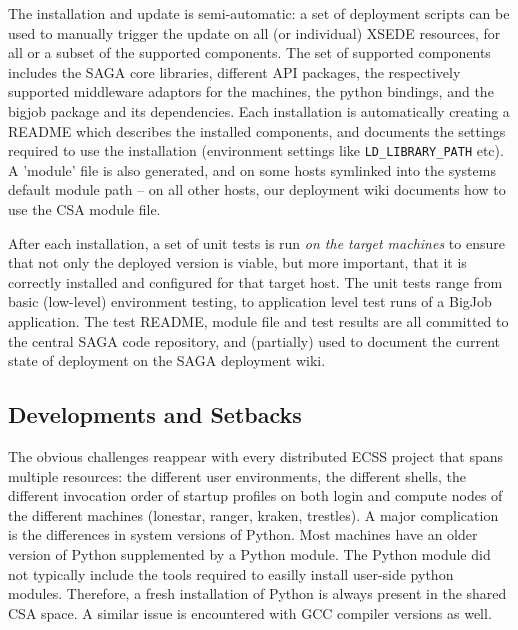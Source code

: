 \documentclass{sig-alternate}
\begin{document}
 The installation and update is semi-automatic: a set of deployment
 scripts can be used to manually trigger the update on all (or
 individual) XSEDE resources, for all or a subset of the supported
 components.  The set of supported components includes the SAGA core
 libraries, different API packages, the respectively supported
 middleware adaptors for the machines, the python bindings, and the
 bigjob package and its dependencies.  Each installation is
 automatically creating a README which describes the installed
 components, and documents the settings required to use the
 installation (environment settings like \texttt{LD\_LIBRARY\_PATH} etc).  A
 'module' file is also generated, and on some hosts symlinked into the
 systems default module path -- on all other hosts, our deployment
 wiki documents how to use the CSA module file.

 After each installation, a set of unit tests is run \textit{on the
 target machines} to ensure that not only the deployed version is
 viable, but more important, that it is correctly installed and
 configured for that target host.  The unit tests range from basic
 (low-level) environment testing, to application level test runs of a
 BigJob application.  The test README, module file and test results
 are all committed to the central SAGA code repository, and
 (partially) used to document the current state of deployment on the
 SAGA deployment wiki.


\subsection{Developments and Setbacks}

The obvious challenges reappear with every distributed ECSS project that spans
multiple resources: the different user environments, the different shells, the
different invocation order of startup profiles on both login and compute nodes
of the different machines (lonestar, ranger, kraken, trestles). A major
complication is the differences in system versions of Python. Most machines
have an older version of Python supplemented by a Python module. The Python
module did not typically include the tools required to easilly install
user-side python modules. Therefore, a fresh installation of Python is always
present in the shared CSA space. A similar issue is encountered with GCC
compiler versions as well.
\end{document}
